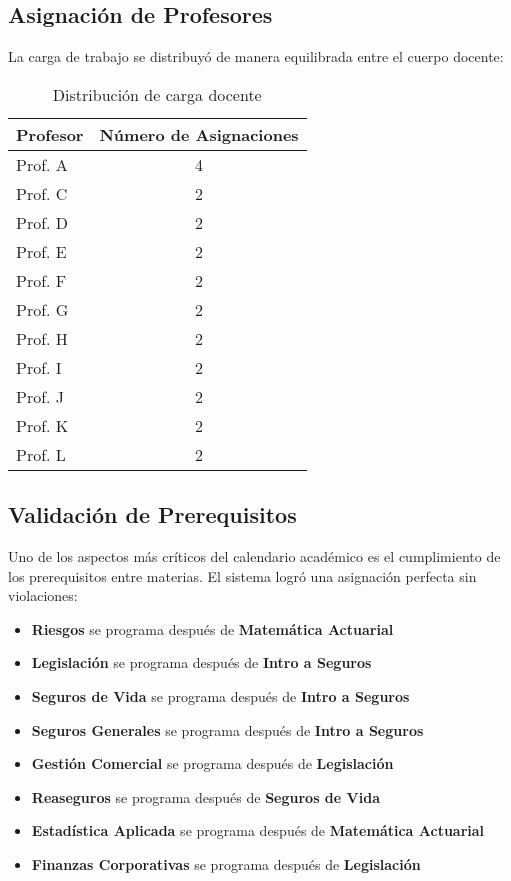 \subsection{Asignación de Profesores}

La carga de trabajo se distribuyó de manera equilibrada entre el cuerpo docente:

\begin{table}[htbp]
\centering
\begin{tabular}{|l|c|}
\hline
\textbf{Profesor} & \textbf{Número de Asignaciones} \\
\hline
Prof. A & 4 \\
Prof. C & 2 \\
Prof. D & 2 \\
Prof. E & 2 \\
Prof. F & 2 \\
Prof. G & 2 \\
Prof. H & 2 \\
Prof. I & 2 \\
Prof. J & 2 \\
Prof. K & 2 \\
Prof. L & 2 \\
\hline
\end{tabular}
\caption{Distribución de carga docente}
\label{tab:carga_docente}
\end{table}

\subsection{Validación de Prerequisitos}

Uno de los aspectos más críticos del calendario académico es el cumplimiento de los prerequisitos entre materias. El sistema logró una asignación perfecta sin violaciones:

\begin{itemize}
    \item \textbf{Riesgos} se programa después de \textbf{Matemática Actuarial}
    \item \textbf{Legislación} se programa después de \textbf{Intro a Seguros}
    \item \textbf{Seguros de Vida} se programa después de \textbf{Intro a Seguros}
    \item \textbf{Seguros Generales} se programa después de \textbf{Intro a Seguros}
    \item \textbf{Gestión Comercial} se programa después de \textbf{Legislación}
    \item \textbf{Reaseguros} se programa después de \textbf{Seguros de Vida}
    \item \textbf{Estadística Aplicada} se programa después de \textbf{Matemática Actuarial}
    \item \textbf{Finanzas Corporativas} se programa después de \textbf{Legislación}
\end{itemize}

